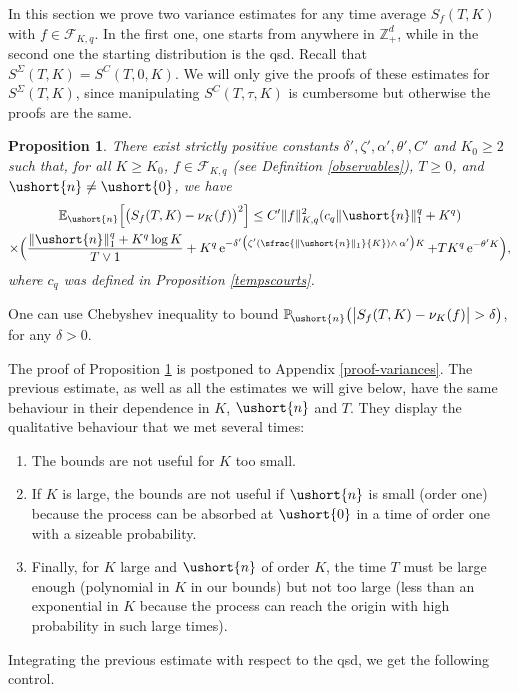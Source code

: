 \documentclass[JEP,XML,SOM,Unicode]{cedram}
\newcommand{\Psfrac}[2]{(\sfrac{#1}{#2})}
\newcommand{\scaleto}[2]{#1}
\numberwithin{equation}{section}
\theoremstyle{plain}
\newtheorem{proposition}[theorem]{Proposition}
\theoremstyle{definition}
\newcommand{\proba}{{\mathbb{P}}}
\newcommand{\E}{{\mathbb{E}}}
\newcommand{\zentiers}{{\mathbb{Z}}}
\newcommand{\domaine}{\zentiers_{+}^{d}}
\newcommand{\sK}{K}
\newcommand{\vecn}{\ushort{n}}
\newcommand{\veczer}{\ushort{0}}
\newcommand{\nuk}{\nu_{K}}\let\snuk\nuk
\newcommand{\e}{\operatorname{e}}
\newcommand{\norm}[1]{\|#1\|_{1}}\let\snorm\norm
\begin{document}
In this section we prove two variance estimates for any time average $S_{f}(T,K)$ with $f\in \mathscr{F}\!_{\sK,q}$.
In the first one, one starts from anywhere in $\domaine$, while in the second one the starting distribution is the qsd.
Recall that $S^{{ \Sigma}}(T,K)=S^{C}(T,0,K)$. We will only give the proofs of these
estimates for $S^{{ \Sigma}}(T,K)$, since manipulating $S^{C}(T,\tau,K)$ is cumbersome but
otherwise the proofs are the same.

\begin{proposition}\label{varcorn}
There exist strictly positive constants $\delta', \zeta', \alpha', \theta', C'$ and $K_0\geq 2$ such that, for all $K\geq K_0$,
$f\!\in\!\mathscr{F}\!_{\sK,q}$ (see Definition \ref{observables}), $T\geq 0$, and $\vecn\neq \veczer$, we have%
\begin{multline*}
\E_{\vecn}\Bigl[\bigl(S_{f}(T,K)-\nuk(f)\bigr)^2\Bigr]
\leq C' \|f\|_{\sK,q}^2(c_q\norm{\vecn}^{\scaleto{q}{3.8pt}} +K^q)\\
\times
\Bigl(
\frac{\norm{\vecn}^{\scaleto{q}{3.6pt}} +K^q \log K}{T\vee 1}+
K^q \e^{-\delta'\bigl(\zeta' \Psfrac{\|\vecn\|_{1}}{K}\wedge \,\alpha'\bigr)K}+ T K^q \e^{-\theta' K}
\Bigr),
\end{multline*}
where $c_q$ was defined in Proposition \ref{tempscourts}.
\end{proposition}

One can use Chebyshev inequality to bound $\proba_{\!\vecn}\bigl(\big|S_{f}(T,K)-\nuk(f)\big|>\delta\bigr)$,
for any $\delta>0$.

The proof of Proposition \ref{varcorn} is postponed to Appendix \ref{proof-variances}.
The previous estimate, as well as all the estimates we will give below, have the same behaviour in their dependence in $K$, $\vecn$ and
$T$. They display the qualitative behaviour that we met several times:
\begin{enumerate}
\item The bounds are not useful for $K$ too small.
\item If $K$ is large, the bounds are not useful if $\vecn$ is small (order one) because the process can be absorbed at
$\veczer$ in a time of order one with a sizeable probability.
\item Finally, for $K$ large and $\vecn$ of order $K$, the time $T$ must be large enough (polynomial in $K$ in
our bounds) but not too large (less than an exponential in $K$ because the process can reach the origin with high probability in
such large times).
\end{enumerate}
Integrating the previous estimate with respect to the qsd, we get the following control.
\end{document}
